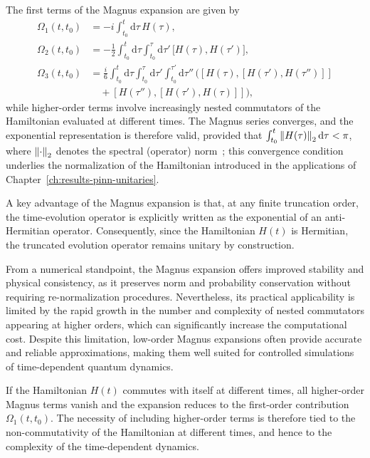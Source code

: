 The first terms of the Magnus expansion are given by
\begin{align}
    \Omega_1(t,t_0) & = -i \int_{t_0}^{t} \mathrm{d}\tau \, H(\tau), \\
    \Omega_2(t,t_0) & = -\frac{1}{2} \int_{t_0}^{t} \mathrm{d}\tau
    \int_{t_0}^{\tau} \mathrm{d}\tau'\,
    \big[ H(\tau), H(\tau') \big],                                   \\
    \Omega_3(t,t_0) & = \frac{i}{6} \int_{t_0}^{t} \mathrm{d}\tau
    \int_{t_0}^{\tau} \mathrm{d}\tau'
    \int_{t_0}^{\tau'} \mathrm{d}\tau'' \,
    \Big(
    [H(\tau),[H(\tau'),H(\tau'')]] \nonumber                         \\
                    & \quad + [H(\tau''),[H(\tau'),H(\tau)]]
    \Big),
\end{align}
while higher-order terms involve increasingly nested commutators of the Hamiltonian evaluated at different times. The Magnus series converges, and the exponential representation is therefore valid, provided that $\int_{t_0}^{t} \norm{H(\tau)}_2 \, \mathrm{d}\tau < \pi$, where $\norm{\cdot}_2$ denotes the spectral (operator) norm~\cite{blanes2009}; this convergence condition underlies the normalization of the Hamiltonian introduced in the applications of Chapter~\ref{ch:results-pinn-unitaries}.

A key advantage of the Magnus expansion is that, at any finite truncation order, the time-evolution operator is explicitly written as the exponential of an anti-Hermitian operator. Consequently, since the Hamiltonian $H(t)$ is Hermitian, the truncated evolution operator remains unitary by construction.

From a numerical standpoint, the Magnus expansion offers improved stability and physical consistency, as it preserves norm and probability conservation without requiring re-normalization procedures. Nevertheless, its practical applicability is limited by the rapid growth in the number and complexity of nested commutators appearing at higher orders, which can significantly increase the computational cost. Despite this limitation, low-order Magnus expansions often provide accurate and reliable approximations, making them well suited for controlled simulations of time-dependent quantum dynamics.

If the Hamiltonian $H(t)$ commutes with itself at different times, all higher-order Magnus terms vanish and the expansion reduces to the first-order contribution $\Omega_1(t,t_0)$. The necessity of including higher-order terms is therefore tied to the non-commutativity of the Hamiltonian at different times, and hence to the complexity of the time-dependent dynamics.

